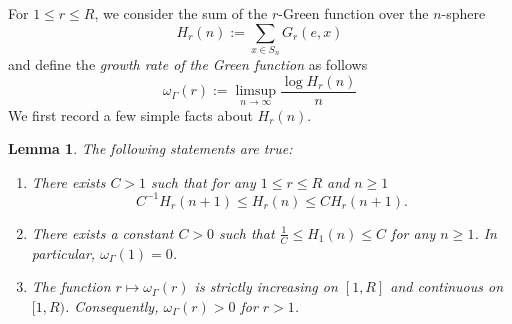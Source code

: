 \documentclass{amsart}
\newtheorem{lem}[thm]{Lemma}
\theoremstyle{definition}
\theoremstyle{remark}
\begin{document}
For $1\le r\le R$, we consider   the sum of the $r$-Green function over the $n$-sphere
   $$H_r(n) := \sum_{x\in S_n} G_r(e,x)$$    
and define the \textit{growth rate  of the Green function} as follows 
$$\omega_\Gamma(r):= \limsup_{n\to \infty} \frac{\log H_r(n)}{n}$$
We first record a few simple facts about $H_r(n)$.
\begin{lem}\label{FactsHrLem}
The following statements are true:
\begin{enumerate}
    \item 
      There exists $C > 1$ such that for any $1 \leq  r \leq R$ and $n \geq 1$
    $$C^{-1} H_{r}(n+1)\le H_r(n) \le CH_{r}(n+1).$$
    \item
    There exists a constant $C>0$ such that $\frac{1}{C}\leq H_1(n)\le C$ for any $n\ge 1$. In particular, $\omega_{\Gamma}(1) = 0$. 
    \item
      The function $r \mapsto \omega_{\Gamma}(r)$ is strictly increasing on $[1,R]$ and continuous on $[1,  R)$. Consequently, $\omega_{\Gamma}(r) > 0$ for $r > 1$.
\end{enumerate}

\end{lem}
\end{document}
